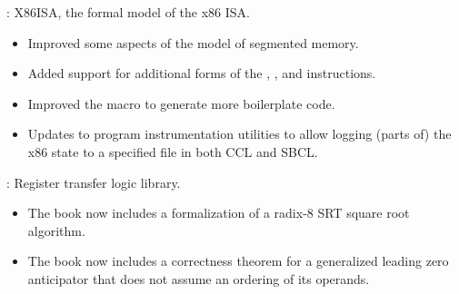 
\begin{frame}

\implibtitle

:
X86ISA, the formal model of the x86 ISA.
\begin{itemize}
\item
Improved some aspects of the model of segmented memory.
\item
Added support for additional forms of the
, , and  instructions.
\item
Improved the  macro to generate more boilerplate code.
\item
Updates to program instrumentation utilities to allow logging (parts of) the x86 state to a specified file in both CCL and SBCL.
\end{itemize}

\end{frame}


\begin{frame}

\implibtitle

:
Register transfer logic library.
\begin{itemize}
\item
The book  now includes
a formalization of a radix-8 SRT square root algorithm.
\item
The book  now includes
a correctness theorem for a generalized leading zero anticipator
that does not assume an ordering of its operands.
\end{itemize}

\end{frame}



